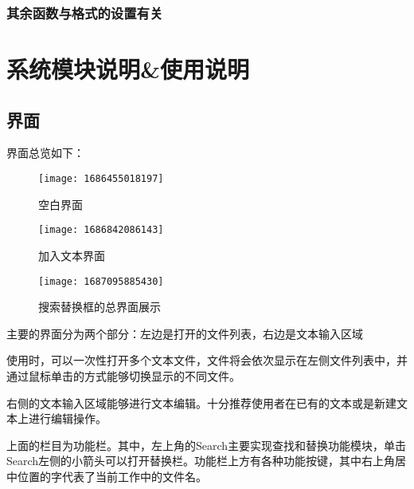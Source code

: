 \documentclass{./source/Report}
\begin{document}
\subsubsection{其余函数与格式的设置有关}

\section{系统模块说明\&使用说明}
\subsection{界面}
界面总览如下：
\begin{figure}[!htbp]
    \begin{minipage}{0.45\textwidth}
        \centering
        \texttt{[image: 1686455018197]}
        \caption{空白界面}
    \end{minipage}
    \begin{minipage}{0.45\textwidth}
        \centering
        \texttt{[image: 1686842086143]}
        \caption{加入文本界面}
    \end{minipage}
\end{figure}

\begin{figure}[!htbp]
    \centering
    \begin{minipage}{0.45\textwidth}
        \centering
        \texttt{[image: 1687095885430]}
            \caption{搜索替换框的总界面展示}
    \end{minipage}
\end{figure}

主要的界面分为两个部分：左边是打开的文件列表，右边是文本输入区域\par
使用时，可以一次性打开多个文本文件，文件将会依次显示在左侧文件列表中，并通过鼠标单击的方式能够切换显示的不同文件。\par
右侧的文本输入区域能够进行文本编辑。十分推荐使用者在已有的文本或是新建文本上进行编辑操作。\par
上面的栏目为功能栏。其中，左上角的Search主要实现查找和替换功能模块，单击Search左侧的小箭头可以打开替换栏。功能栏上方有各种功能按键，其中右上角居中位置的字代表了当前工作中的文件名。
\end{document}
